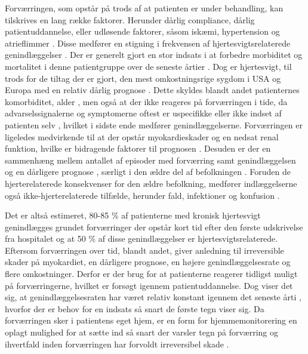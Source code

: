 Forværringen, som opstår på trods af at patienten er under behandling, kan tilskrives en lang række faktorer. Herunder dårlig compliance, dårlig patientuddannelse, eller udløsende faktorer, såsom iskæmi, hypertension og atrieflimmer \citep{Gheorghiade2009}. Disse medfører en stigning i frekvensen af hjertesvigtsrelaterede genindlæggelser \citep{Murray2009}. Der er generelt gjort en stor indsats i at forbedre morbiditet og mortalitet i denne patientgruppe over de seneste årtier \citep{VBetihavas2013}. Dog er hjertesvigt, til trods for de tiltag der er gjort, den mest omkostningsrige sygdom i USA og Europa med en relativ dårlig prognose \citep{}. Dette skyldes blandt andet patienternes komorbiditet, alder \citep{JOyanguren2016}, men også at der ikke reageres på forværringen i tide, da advarselssignalerne og symptomerne oftest er uspecifikke eller ikke indset af patienten selv \citep{VConraads2011}, hvilket i sidste ende medfører genindlæggelserne. Forværringen er ligeledes medvirkende til at der opstår myokardieskader og en nedsat renal funktion, hvilke er bidragende faktorer til prognosen \citep{Gheorghiade2009}. Desuden er der en sammenhæng mellem antallet af episoder med forværring samt genindlæggelsen og en dårligere prognose \citep{JOyanguren2016,VConraads2011,VLueder2012}, særligt i den ældre del af befolkningen \citep{VLueder2012}. Foruden de hjerterelaterede konsekvenser for den ældre befolkning, medfører indlæggelserne også ikke-hjerterelaterede tilfælde, herunder fald, infektioner og konfusion \citep{VBetihavas2013}.%

Det er altså estimeret, 80-85 \% af patienterne med kronisk hjertesvigt genindlægges grundet forværringer der opstår 
kort tid efter den første udskrivelse fra hospitalet og at 50 \% af disse genindlæggelser er hjertesvigtsrelaterede. Eftersom forværringen over tid, blandt andet, giver anledning til irreversible skader på myokardiet, en dårligere prognose, en højere genindlæggelsesrate og flere omkostninger. Derfor er der brug for at patienterne reagerer tidligst muligt på forværringerne, hvilket er forsøgt igennem patientuddannelse. Dog viser det sig, at genindlæggelsesraten har været relativ konstant igennem det seneste årti \citep{Inan2018}, hvorfor der er behov for en indsats så snart de første tegn viser sig. Da forværringen sker i patientens eget hjem, er en form for hjemmemonitorering en oplagt mulighed for at sætte ind så snart der varsler tegn på forværring og ihvertfald inden forværringen har forvoldt irreversibel skade \citep{}. 